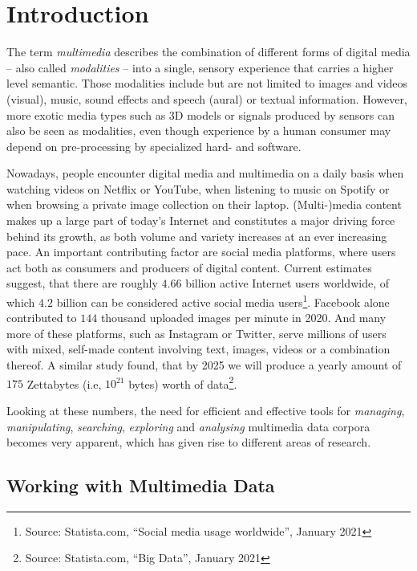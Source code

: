 \chapter{Introduction}
The term \emph{multimedia} describes the combination of different forms of digital media -- also called \emph{modalities} -- into a single, sensory experience that carries a higher level semantic. Those modalities include but are not limited to images and videos (visual), music, sound effects and speech (aural) or textual information. However, more exotic media types such as 3D models or signals produced by sensors can also be seen as modalities, even though experience by a human consumer may depend on pre-processing by specialized hard- and software.

Nowadays, people encounter digital media and multimedia on a daily basis when watching videos on Netflix or YouTube, when listening to music on Spotify or when browsing a private image collection on their laptop. (Multi-)media content makes up a large part of today's Internet and constitutes a major driving force behind its growth, as both volume and variety increases at an ever increasing pace. An important contributing factor are social media platforms, where users act both as consumers and producers of digital content. Current estimates suggest, that there are roughly $4.66$ billion active Internet users worldwide, of which $4.2$ billion can be considered active social media users\footnote{Source: Statista.com, ``Social media usage worldwide'', January 2021}. Facebook alone contributed to $144$ thousand uploaded images per minute in 2020. And many more of these  platforms, such as Instagram or Twitter, serve millions of users with mixed, self-made content involving text, images, videos or a combination thereof. A similar study found, that by 2025 we will produce a yearly amount of $175$ Zettabytes (i.e, $10^{21}$ bytes) worth of data\footnote{Source: Statista.com, ``Big Data'', January 2021}.

Looking at these numbers, the need for efficient and effective tools for \emph{managing}, \emph{manipulating}, \emph{searching}, \emph{exploring} and \emph{analysing} multimedia data corpora becomes very apparent, which has given rise to different areas of research.

\section{Working with Multimedia Data}

